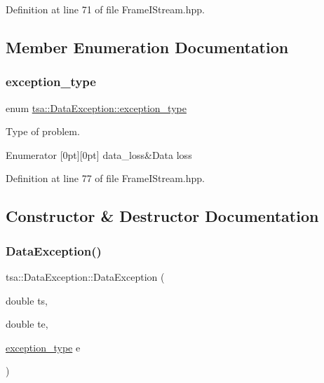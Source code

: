 Definition at line 71 of file Frame\+I\+Stream.\+hpp.



\subsection{Member Enumeration Documentation}
\mbox{\label{structtsa_1_1_data_exception_a712f1aa505cbed35af618dd632181d18}} 
\subsubsection{\texorpdfstring{exception\+\_\+type}{exception\_type}}
{\footnotesize\ttfamily enum \hyperlink{structtsa_1_1_data_exception_a712f1aa505cbed35af618dd632181d18}{tsa\+::\+Data\+Exception\+::exception\+\_\+type}}

Type of problem. \begin{DoxyEnumFields}{Enumerator}
[0pt][0pt]{}\mbox{\label{structtsa_1_1_data_exception_a712f1aa505cbed35af618dd632181d18a290a1df6b3d5c0756ca3bb8c12a4e25e}} 
data\+\_\+loss&Data loss \\
\hline

\end{DoxyEnumFields}


Definition at line 77 of file Frame\+I\+Stream.\+hpp.



\subsection{Constructor \& Destructor Documentation}
\mbox{\label{structtsa_1_1_data_exception_a9f85452c8350284658dc9c8389871c19}} 
\subsubsection{\texorpdfstring{Data\+Exception()}{DataException()}}
{\footnotesize\ttfamily tsa\+::\+Data\+Exception\+::\+Data\+Exception (\begin{DoxyParamCaption}\item[{double}]{ts,  }\item[{double}]{te,  }\item[{\hyperlink{structtsa_1_1_data_exception_a712f1aa505cbed35af618dd632181d18}{exception\+\_\+type}}]{e }\end{DoxyParamCaption})\hspace{0.3cm}{\ttfamily [inline]}}

